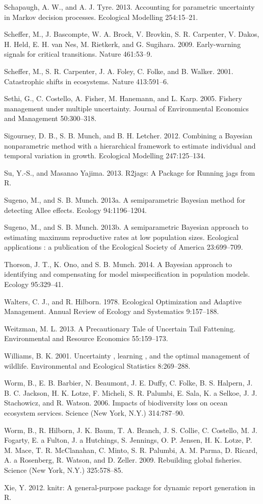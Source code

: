 \documentclass[]{components/elsarticle}
\begin{document}
Schapaugh, A. W., and A. J. Tyre. 2013. Accounting for parametric
uncertainty in Markov decision processes. Ecological Modelling
254:15--21.

Scheffer, M., J. Bascompte, W. A. Brock, V. Brovkin, S. R. Carpenter, V.
Dakos, H. Held, E. H. van Nes, M. Rietkerk, and G. Sugihara. 2009.
Early-warning signals for critical transitions. Nature 461:53--9.

Scheffer, M., S. R. Carpenter, J. A. Foley, C. Folke, and B. Walker.
2001. Catastrophic shifts in ecosystems. Nature 413:591--6.

Sethi, G., C. Costello, A. Fisher, M. Hanemann, and L. Karp. 2005.
Fishery management under multiple uncertainty. Journal of Environmental
Economics and Management 50:300--318.

Sigourney, D. B., S. B. Munch, and B. H. Letcher. 2012. Combining a
Bayesian nonparametric method with a hierarchical framework to estimate
individual and temporal variation in growth. Ecological Modelling
247:125--134.

Su, Y.-S., and Masanao Yajima. 2013. R2jags: A Package for Running jags
from R.

Sugeno, M., and S. B. Munch. 2013a. A semiparametric Bayesian method for
detecting Allee effects. Ecology 94:1196--1204.

Sugeno, M., and S. B. Munch. 2013b. A semiparametric Bayesian approach
to estimating maximum reproductive rates at low population sizes.
Ecological applications : a publication of the Ecological Society of
America 23:699--709.

Thorson, J. T., K. Ono, and S. B. Munch. 2014. A Bayesian approach to
identifying and compensating for model misspecification in population
models. Ecology 95:329--41.

Walters, C. J., and R. Hilborn. 1978. Ecological Optimization and
Adaptive Management. Annual Review of Ecology and Systematics
9:157--188.

Weitzman, M. L. 2013. A Precautionary Tale of Uncertain Tail Fattening.
Environmental and Resource Economics 55:159--173.

Williams, B. K. 2001. Uncertainty , learning , and the optimal
management of wildlife. Environmental and Ecological Statistics
8:269--288.

Worm, B., E. B. Barbier, N. Beaumont, J. E. Duffy, C. Folke, B. S.
Halpern, J. B. C. Jackson, H. K. Lotze, F. Micheli, S. R. Palumbi, E.
Sala, K. a Selkoe, J. J. Stachowicz, and R. Watson. 2006. Impacts of
biodiversity loss on ocean ecosystem services. Science (New York, N.Y.)
314:787--90.

Worm, B., R. Hilborn, J. K. Baum, T. A. Branch, J. S. Collie, C.
Costello, M. J. Fogarty, E. a Fulton, J. a Hutchings, S. Jennings, O. P.
Jensen, H. K. Lotze, P. M. Mace, T. R. McClanahan, C. Minto, S. R.
Palumbi, A. M. Parma, D. Ricard, A. a Rosenberg, R. Watson, and D.
Zeller. 2009. Rebuilding global fisheries. Science (New York, N.Y.)
325:578--85.

Xie, Y. 2012. knitr: A general-purpose package for dynamic report
generation in R.
\end{document}
